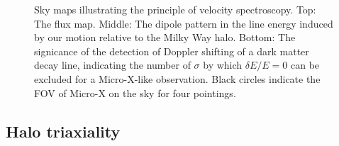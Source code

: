 \documentclass[aps,prl,10pt,twocolumn,superscriptaddress,showpacs]{revtex4-1}
\begin{document}
\begin{figure}[h!]
\begin{subfigure}[b]{1.0\columnwidth}
\end{subfigure}
\caption{Sky maps illustrating the principle of velocity spectroscopy. Top: The flux map. Middle:
	The dipole pattern in the line energy induced by our motion relative to the Milky Way halo.
	Bottom: The signicance of the detection of Doppler shifting of a dark matter decay line,
indicating the number of $\sigma$ by which $\delta E/E=0$ can be excluded for a Micro-X-like
observation. Black circles indicate the
FOV of Micro-X on the sky for four pointings. }
\label{fig:skymaps}
\end{figure}



\subsection{Halo triaxiality}
\label{sec:triaxiality}
\end{document}
